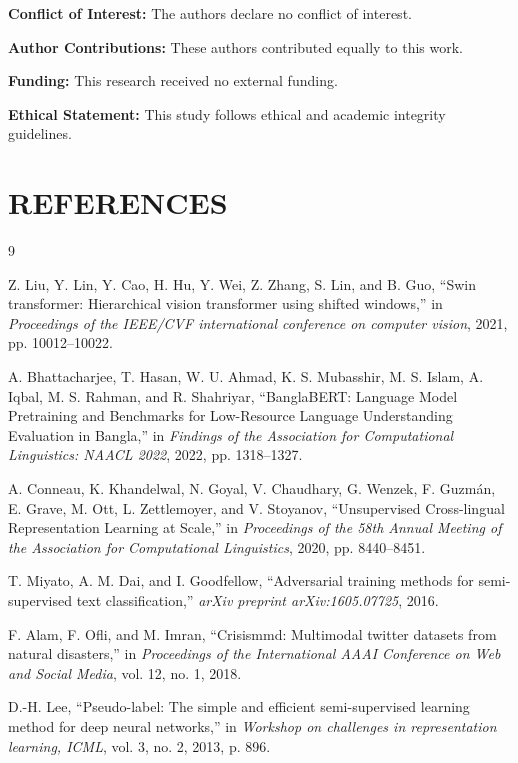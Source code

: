 \documentclass[twoside,twocolumn,10pt]{article}
\begin{document}
\small
\textbf{Conflict of Interest:} The authors declare no conflict of interest.

\textbf{Author Contributions:} These authors contributed equally to this work.

\textbf{Funding:} This research received no external funding.

\textbf{Ethical Statement:} This study follows ethical and academic integrity guidelines.

\balance
\fontsize{11}{13}\selectfont

\section{\MakeUppercase{REFERENCES}}
\begin{thebibliography}{9}

Z. Liu, Y. Lin, Y. Cao, H. Hu, Y. Wei, Z. Zhang, S. Lin, and B. Guo, ``Swin transformer: Hierarchical vision transformer using shifted windows,'' in \emph{Proceedings of the IEEE/CVF international conference on computer vision}, 2021, pp. 10012--10022.

A. Bhattacharjee, T. Hasan, W. U. Ahmad, K. S. Mubasshir, M. S. Islam, A. Iqbal, M. S. Rahman, and R. Shahriyar, ``BanglaBERT: Language Model Pretraining and Benchmarks for Low-Resource Language Understanding Evaluation in Bangla,'' in \emph{Findings of the Association for Computational Linguistics: NAACL 2022}, 2022, pp. 1318--1327.

A. Conneau, K. Khandelwal, N. Goyal, V. Chaudhary, G. Wenzek, F. Guzm{\'a}n, E. Grave, M. Ott, L. Zettlemoyer, and V. Stoyanov, ``Unsupervised Cross-lingual Representation Learning at Scale,'' in \emph{Proceedings of the 58th Annual Meeting of the Association for Computational Linguistics}, 2020, pp. 8440--8451.

T. Miyato, A. M. Dai, and I. Goodfellow, ``Adversarial training methods for semi-supervised text classification,'' \emph{arXiv preprint arXiv:1605.07725}, 2016.

F. Alam, F. Ofli, and M. Imran, ``Crisismmd: Multimodal twitter datasets from natural disasters,'' in \emph{Proceedings of the International AAAI Conference on Web and Social Media}, vol. 12, no. 1, 2018.

D.-H. Lee, ``Pseudo-label: The simple and efficient semi-supervised learning method for deep neural networks,'' in \emph{Workshop on challenges in representation learning, ICML}, vol. 3, no. 2, 2013, p. 896.


\end{thebibliography}
\end{document}
